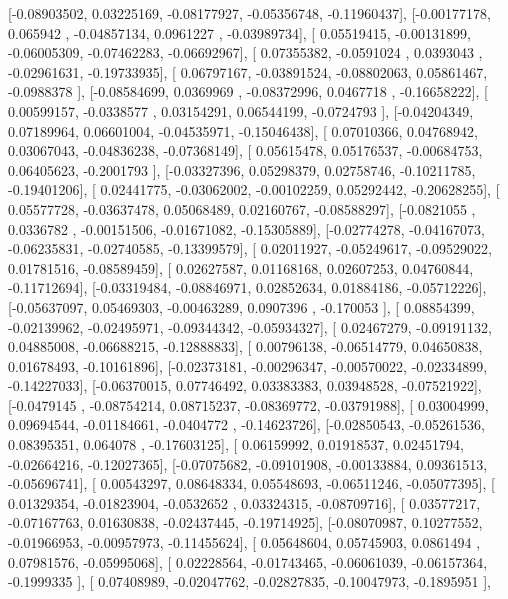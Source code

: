 \documentclass{article}
\begin{document}
       [-0.08903502,  0.03225169, -0.08177927, -0.05356748, -0.11960437],
       [-0.00177178,  0.065942  , -0.04857134,  0.0961227 , -0.03989734],
       [ 0.05519415, -0.00131899, -0.06005309, -0.07462283, -0.06692967],
       [ 0.07355382, -0.0591024 ,  0.0393043 , -0.02961631, -0.19733935],
       [ 0.06797167, -0.03891524, -0.08802063,  0.05861467, -0.0988378 ],
       [-0.08584699,  0.0369969 , -0.08372996,  0.0467718 , -0.16658222],
       [ 0.00599157, -0.0338577 ,  0.03154291,  0.06544199, -0.0724793 ],
       [-0.04204349,  0.07189964,  0.06601004, -0.04535971, -0.15046438],
       [ 0.07010366,  0.04768942,  0.03067043, -0.04836238, -0.07368149],
       [ 0.05615478,  0.05176537, -0.00684753,  0.06405623, -0.2001793 ],
       [-0.03327396,  0.05298379,  0.02758746, -0.10211785, -0.19401206],
       [ 0.02441775, -0.03062002, -0.00102259,  0.05292442, -0.20628255],
       [ 0.05577728, -0.03637478,  0.05068489,  0.02160767, -0.08588297],
       [-0.0821055 ,  0.0336782 , -0.00151506, -0.01671082, -0.15305889],
       [-0.02774278, -0.04167073, -0.06235831, -0.02740585, -0.13399579],
       [ 0.02011927, -0.05249617, -0.09529022,  0.01781516, -0.08589459],
       [ 0.02627587,  0.01168168,  0.02607253,  0.04760844, -0.11712694],
       [-0.03319484, -0.08846971,  0.02852634,  0.01884186, -0.05712226],
       [-0.05637097,  0.05469303, -0.00463289,  0.0907396 , -0.170053  ],
       [ 0.08854399, -0.02139962, -0.02495971, -0.09344342, -0.05934327],
       [ 0.02467279, -0.09191132,  0.04885008, -0.06688215, -0.12888833],
       [ 0.00796138, -0.06514779,  0.04650838,  0.01678493, -0.10161896],
       [-0.02373181, -0.00296347, -0.00570022, -0.02334899, -0.14227033],
       [-0.06370015,  0.07746492,  0.03383383,  0.03948528, -0.07521922],
       [-0.0479145 , -0.08754214,  0.08715237, -0.08369772, -0.03791988],
       [ 0.03004999,  0.09694544, -0.01184661, -0.0404772 , -0.14623726],
       [-0.02850543, -0.05261536,  0.08395351,  0.064078  , -0.17603125],
       [ 0.06159992,  0.01918537,  0.02451794, -0.02664216, -0.12027365],
       [-0.07075682, -0.09101908, -0.00133884,  0.09361513, -0.05696741],
       [ 0.00543297,  0.08648334,  0.05548693, -0.06511246, -0.05077395],
       [ 0.01329354, -0.01823904, -0.0532652 ,  0.03324315, -0.08709716],
       [ 0.03577217, -0.07167763,  0.01630838, -0.02437445, -0.19714925],
       [-0.08070987,  0.10277552, -0.01966953, -0.00957973, -0.11455624],
       [ 0.05648604,  0.05745903,  0.0861494 ,  0.07981576, -0.05995068],
       [ 0.02228564, -0.01743465, -0.06061039, -0.06157364, -0.1999335 ],
       [ 0.07408989, -0.02047762, -0.02827835, -0.10047973, -0.1895951 ],
\end{document}
